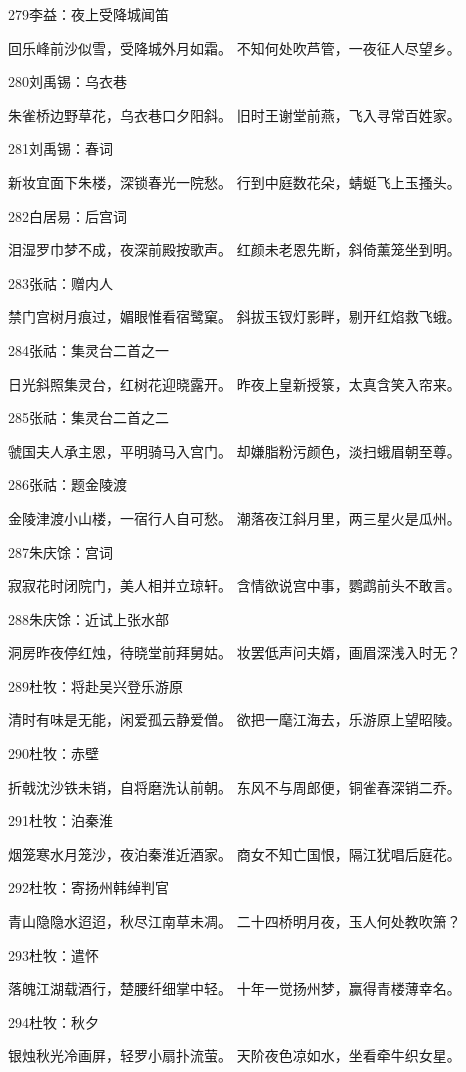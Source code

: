 279李益：夜上受降城闻笛

回乐峰前沙似雪，受降城外月如霜。
不知何处吹芦管，一夜征人尽望乡。

280刘禹锡：乌衣巷

朱雀桥边野草花，乌衣巷口夕阳斜。
旧时王谢堂前燕，飞入寻常百姓家。

281刘禹锡：春词

新妆宜面下朱楼，深锁春光一院愁。
行到中庭数花朵，蜻蜓飞上玉搔头。

282白居易：后宫词

泪湿罗巾梦不成，夜深前殿按歌声。
红颜未老恩先断，斜倚薰笼坐到明。

283张祜：赠内人

禁门宫树月痕过，媚眼惟看宿鹭窠。
斜拔玉钗灯影畔，剔开红焰救飞蛾。

284张祜：集灵台二首之一

日光斜照集灵台，红树花迎晓露开。
昨夜上皇新授箓，太真含笑入帘来。

285张祜：集灵台二首之二

虢国夫人承主恩，平明骑马入宫门。
却嫌脂粉污颜色，淡扫蛾眉朝至尊。

286张祜：题金陵渡

金陵津渡小山楼，一宿行人自可愁。
潮落夜江斜月里，两三星火是瓜州。

287朱庆馀：宫词

寂寂花时闭院门，美人相并立琼轩。
含情欲说宫中事，鹦鹉前头不敢言。

288朱庆馀：近试上张水部

洞房昨夜停红烛，待晓堂前拜舅姑。
妆罢低声问夫婿，画眉深浅入时无？

289杜牧：将赴吴兴登乐游原

清时有味是无能，闲爱孤云静爱僧。
欲把一麾江海去，乐游原上望昭陵。

290杜牧：赤壁

折戟沈沙铁未销，自将磨洗认前朝。
东风不与周郎便，铜雀春深销二乔。

291杜牧：泊秦淮

烟笼寒水月笼沙，夜泊秦淮近酒家。
商女不知亡国恨，隔江犹唱后庭花。

292杜牧：寄扬州韩绰判官

青山隐隐水迢迢，秋尽江南草未凋。
二十四桥明月夜，玉人何处教吹箫？

293杜牧：遣怀

落魄江湖载酒行，楚腰纤细掌中轻。
十年一觉扬州梦，赢得青楼薄幸名。

294杜牧：秋夕

银烛秋光冷画屏，轻罗小扇扑流萤。
天阶夜色凉如水，坐看牵牛织女星。

